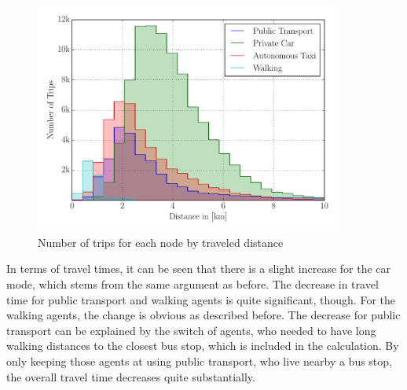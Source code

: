 \begin{figure}
    \centering
    \includegraphics[width=0.9\textwidth]{figures/modehist_av.pdf}
    \caption{Number of trips for each node by traveled distance}
    \label{fig:modehist_av}
\end{figure}

In terms of travel times, it can be seen that there is a slight increase for the car
mode, which stems from the same argument as before. The decrease in travel time for
public transport and walking agents is quite significant, though. For the walking
agents, the change is obvious as described before. The decrease for public transport
can be explained by the switch of agents, who needed to have long walking distances
to the closest bus stop, which is included in the calculation. By only keeping those
agents at using public transport, who live nearby a bus stop, the overall travel
time decreases quite substantially.

